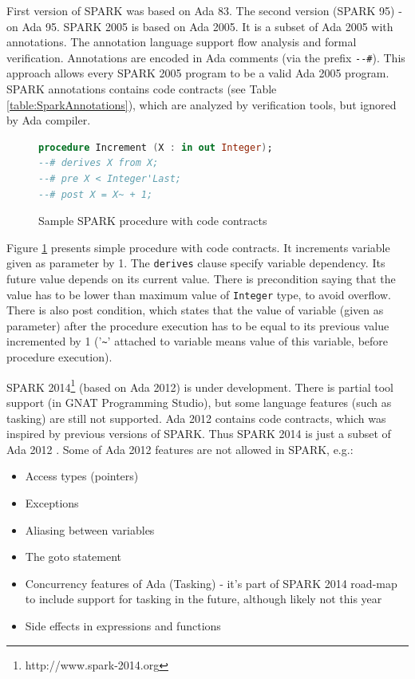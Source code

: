 First version of SPARK was based on Ada 83. The second version (SPARK 95) - on Ada 95. SPARK 2005 is based on Ada 2005. It is a subset of Ada 2005 with annotations. The annotation language support flow analysis and formal verification. Annotations are encoded in Ada comments (via the prefix \lstinline{--#}). This approach allows every SPARK 2005 program to be a valid Ada 2005 program. SPARK annotations contains code contracts (see Table \ref{table:SparkAnnotations}), which are analyzed by verification tools, but ignored by Ada compiler.

\begin{figure}[ht]
\singlespacing
\begin{lstlisting}[language=ada, frame=single, gobble=0]
procedure Increment (X : in out Integer);
--# derives X from X;
--# pre X < Integer'Last;
--# post X = X~ + 1;
\end{lstlisting} 
\doublespacing
\caption{Sample SPARK procedure with code contracts}
\label{listing:SPARK2005Contracts}
\end{figure}

Figure \ref{listing:SPARK2005Contracts} presents simple procedure with code contracts. It increments variable given as parameter by 1. The \lstinline{derives} clause specify variable dependency. Its future value depends on its current value. There is precondition saying that the value has to be lower than maximum value of \lstinline{Integer} type, to avoid overflow. There is also post condition, which states that the value of variable (given as parameter) after the procedure execution has to be equal to its previous value incremented by 1 ('\lstinline{~}' attached to variable means value of this variable, before procedure execution).

SPARK 2014\footnote{http://www.spark-2014.org} (based on Ada 2012) is under development. There is partial tool support (in GNAT Programming Studio), but some language features (such as tasking) are still not supported. Ada 2012 contains code contracts, which was inspired by previous versions of SPARK. Thus SPARK 2014 is just a subset of Ada 2012 \cite{Spark2014:Paper}. Some of Ada 2012 features are not allowed in SPARK, e.g.:
\begin{itemize} %
 	\item Access types (pointers)
 	\item Exceptions
	\item Aliasing between variables
	\item The goto statement
	\item Concurrency features of Ada (Tasking) - it's part of SPARK 2014 road-map to include support for tasking in the future, although likely not this year
	\item Side effects in expressions and functions
\end{itemize}

